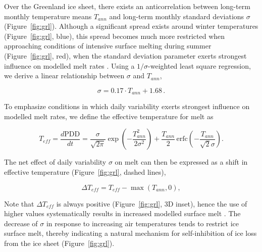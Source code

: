 \documentclass[review]{igs}
\begin{document}
Over the Greenland ice sheet, there exists an anticorrelation between long-term monthly temperature means $T_{ann}$ and long-term monthly standard deviations $\sigma$ (Figure~\ref{fig:grl}). Although a significant spread exists around winter temperatures (Figure~\ref{fig:grl}, blue), this spread becomes much more restricted when approaching conditions of intensive surface melting during summer (Figure~\ref{fig:grl}, red), when the standard deviation parameter exerts strongest influence on modelled melt rates \citep{rogozhina-rau-inpress}. Using a $1/\sigma$-weighted least square regression, we derive a linear relationship between $\sigma$ and $T_{ann}$,

\begin{equation} \label{eq:sigma}
    \sigma = 0.17 \cdot T_{ann} + 1.68\,.
\end{equation}

To emphasize conditions in which daily variability exerts strongest influence on modelled melt rates, we define the effective temperature for melt as

\begin{equation} \label{eq:teff}
    T_{eff} = \frac{d\mathrm{PDD}}{dt}
        = \frac{\sigma}{\sqrt{2\pi}} \exp\left({-\frac{T_{ann}^2}{2\sigma^2}}\right)
            + \frac{T_{ann}}{2} \, \mathrm{erfc} \left(-\frac{T_{ann}}{\sqrt{2}\sigma}\right).
\end{equation}

The net effect of daily variability $\sigma$ on melt can then be expressed as a shift in effective temperature (Figure~\ref{fig:grl}, dashed lines),

\begin{equation} \label{eq:dteff}
    \Delta T_{eff} = T_{eff} - \max(T_{ann}, 0),
\end{equation}

Note that $\Delta T_{eff}$ is always positive (Figure~\ref{fig:grl}, 3D inset), hence the use of higher values systematically results in increased modelled surface melt \citep{rogozhina-rau-inpress}. The decrease of $\sigma$ in response to increasing air temperatures tends to restrict ice surface melt, thereby indicating a natural mechanism for self-inhibition of ice loss from the ice sheet (Figure~\ref{fig:grl}).
\end{document}
